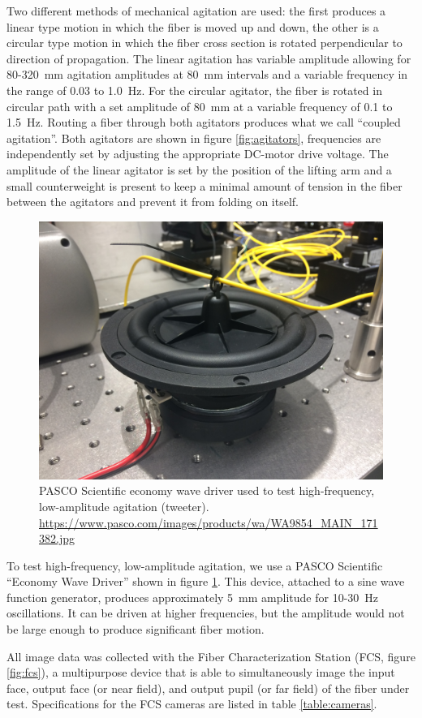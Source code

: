 \documentclass[twocolumn]{emulateapj}
\begin{document}
Two different methods of mechanical agitation are used: the first produces a linear type motion in which the fiber is moved up and down, the other is a circular type motion in which the fiber cross section is rotated perpendicular to direction of propagation. The linear agitation has variable amplitude allowing for 80-\SI{320}{\milli\meter} agitation amplitudes at \SI{80}{\milli\meter} intervals and a variable frequency in the range of 0.03 to \SI{1.0}{\hertz}. For the circular agitator, the fiber is rotated in circular path with a set amplitude of \SI{80}{\milli\meter} at a variable frequency of 0.1 to \SI{1.5}{\hertz}. Routing a fiber through both agitators produces what we call ``coupled agitation''.  Both agitators are shown in figure \ref{fig:agitators}, frequencies are independently set by adjusting the appropriate DC-motor drive voltage. The amplitude of the linear agitator is set by the position of the lifting arm and a small counterweight is present to keep a minimal amount of tension in the fiber between the agitators and prevent it from folding on itself.

\begin{figure}
\centering
	\includegraphics[width=0.5\columnwidth]{images/tweeter.jpg}
	\caption{PASCO Scientific economy wave driver used to test high-frequency, low-amplitude agitation (tweeter). \url{https://www.pasco.com/images/products/wa/WA9854_MAIN_171382.jpg}}
\label{fig:tweeter}
\end{figure}

To test high-frequency, low-amplitude agitation, we use a PASCO Scientific ``Economy Wave Driver'' shown in figure \ref{fig:tweeter}. This device, attached to a sine wave function generator, produces approximately \SI{5}{\milli\meter} amplitude for 10-\SI{30}{\hertz} oscillations. It can be driven at higher frequencies, but the amplitude would not be large enough to produce significant fiber motion.

All image data was collected with the Fiber Characterization Station (FCS, figure \ref{fig:fcs}), a multipurpose device that is able to simultaneously image the input face, output face (or near field), and output pupil (or far field) of the fiber under test. Specifications for the FCS cameras are listed in table \ref{table:cameras}.
\end{document}
